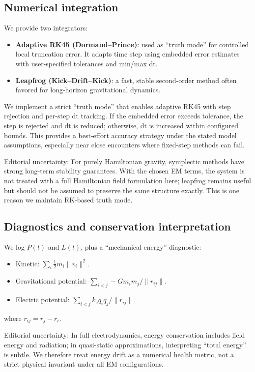 \documentclass[11pt]{article}
\begin{document}
\subsection{Numerical integration}
We provide two integrators:
\begin{itemize}
\item \textbf{Adaptive RK45 (Dormand--Prince)}\cite{Dormand1980}: used as ``truth mode'' for controlled local truncation error. It adapts time step using embedded error estimates with user-specified tolerances and min/max dt.
\item \textbf{Leapfrog (Kick--Drift--Kick)}\cite{Verlet1967,Ruth1983,Yoshida1990,ForestRuth1990}: a fast, stable second-order method often favored for long-horizon gravitational dynamics.
\end{itemize}

We implement a strict ``truth mode'' that enables adaptive RK45 with step rejection and per-step dt tracking. If the embedded error exceeds tolerance, the step is rejected and dt is reduced; otherwise, dt is increased within configured bounds. This provides a best-effort accuracy strategy under the stated model assumptions, especially near close encounters where fixed-step methods can fail.

Editorial uncertainty: For purely Hamiltonian gravity, symplectic methods have strong long-term stability guarantees. With the chosen EM terms, the system is not treated with a full Hamiltonian field formulation here; leapfrog remains useful but should not be assumed to preserve the same structure exactly. This is one reason we maintain RK-based truth mode.

\subsection{Diagnostics and conservation interpretation}
We log $P(t)$ and $L(t)$, plus a ``mechanical energy'' diagnostic:
\begin{itemize}
\item Kinetic: $\sum_i \frac{1}{2} m_i \|v_i\|^2$.
\item Gravitational potential: $\sum_{i<j} -G m_i m_j / \|r_{ij}\|$.
\item Electric potential: $\sum_{i<j} k_e q_i q_j / \|r_{ij}\|$.
\end{itemize}
where $r_{ij} = r_j - r_i$.

Editorial uncertainty: In full electrodynamics, energy conservation includes field energy and radiation; in quasi-static approximations, interpreting ``total energy'' is subtle. We therefore treat energy drift as a numerical health metric, not a strict physical invariant under all EM configurations.
\end{document}
